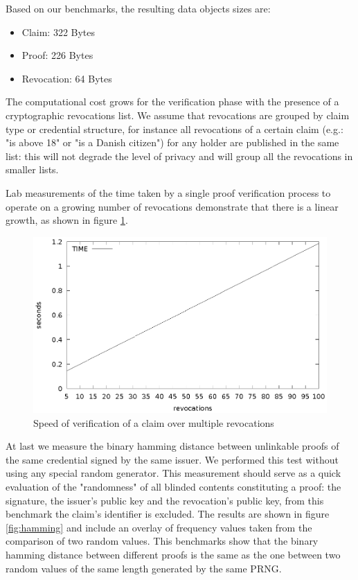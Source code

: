 \documentclass[conference]{IEEEtran}
\begin{document}
Based on our benchmarks, the resulting data objects sizes are:
\begin{itemize}
    \item Claim: 322 Bytes
    \item Proof:  226 Bytes
    \item Revocation: 64 Bytes
\end{itemize}

The computational cost grows for the verification phase with the presence of a cryptographic revocations list. We assume that revocations are grouped by claim type or credential structure, for instance all revocations of a certain claim (e.g.: "is above 18" or "is a Danish citizen") for any holder are published in the same list: this will not degrade the level of privacy and will group all the revocations in smaller lists.

Lab measurements of the time taken by a single proof verification process to operate on a growing number of revocations demonstrate that there is a linear growth, as shown in figure \ref{fig:verifyrevocations}.

\begin{figure}
    \centering
    \includegraphics[width=1\linewidth]{verifyrevocations.eps}

    \caption{Speed of verification of a claim over multiple revocations}
    \label{fig:verifyrevocations}
\end{figure}

At last we measure the binary hamming distance between unlinkable proofs of the same credential signed by the same issuer. We performed this test without using any special random generator.  This measurement should serve as a quick evaluation of the "randomness" of all blinded contents constituting a proof: the signature, the issuer's public key and the revocation's public key, from this benchmark the claim's identifier is excluded. The results are shown in figure \ref{fig:hamming} and include an overlay of frequency values taken from the comparison of two random values. This benchmarks show that the binary hamming distance between different proofs is the same as the one between two random values of the same length generated by the same PRNG.
\end{document}
